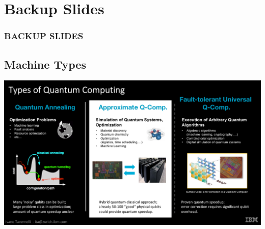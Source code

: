 \documentclass[aspectratio=169,11pt,hyperref={colorlinks=true}]{beamer}
\begin{document}
\section{Backup Slides}
\begin{frame}[noframenumbering]
    \frametitle{BACKUP SLIDES}
\end{frame}
\subsection{Machine Types}
\begin{frame}[noframenumbering]
    \includegraphics[width=\textwidth]{machine_types.png}
\end{frame}
\end{document}
